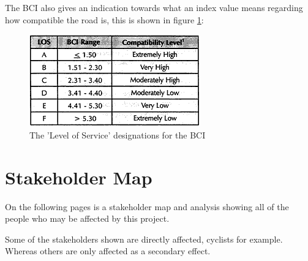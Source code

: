 \documentclass[a4paper]{report}
\begin{document}
{The BCI also gives an indication towards what an index value means regarding how compatible the road is, this is shown in figure \ref{fig:bci_los}:

\begin{figure}[h]
\centering
\includegraphics[scale=0.7]{figures/research_report/bci_los}
\caption{The 'Level of Service' designations for the BCI}
\label{fig:bci_los}
\end{figure}

\chapter{Stakeholder Map}
\label{ch:stakeholders}
On the following pages is a stakeholder map and analysis showing all of the people who may be affected by this project. 

Some of the stakeholders shown are directly affected, cyclists for example. Whereas others are only affected as a secondary effect.

}
\end{document}
